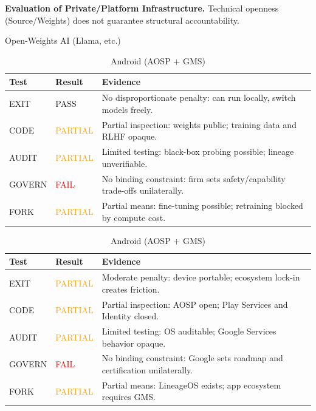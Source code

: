 \documentclass{article}
\begin{document}
\begin{table}[htbp]
    \centering
    \caption{\textbf{Evaluation of Private/Platform Infrastructure.} Technical openness (Source/Weights) does not guarantee structural accountability.}
    \label{tab:corp_infra}

    \begin{subtable}{1\textwidth}
        \centering
        \caption{Open-Weights AI (Llama, etc.)}
        \small
        \begin{tabular}{@{}llp{8.5cm}@{}}
            \toprule
            \textbf{Test} & \textbf{Result} & \textbf{Evidence} \\
            \midrule
            EXIT & \textcolor{green!50!black}{PASS} & No disproportionate penalty: can run locally, switch models freely. \\
            CODE & \textcolor{orange}{PARTIAL} & Partial inspection: weights public; training data and RLHF opaque. \\
            AUDIT & \textcolor{orange}{PARTIAL} & Limited testing: black-box probing possible; lineage unverifiable. \\
            GOVERN & \textcolor{red}{FAIL} & No binding constraint: firm sets safety/capability trade-offs unilaterally. \\
            FORK & \textcolor{orange}{PARTIAL} & Partial means: fine-tuning possible; retraining blocked by compute cost. \\
            \bottomrule
        \end{tabular}
        \vspace{0.3cm}
    \end{subtable}

    \begin{subtable}{1\textwidth}
        \centering
        \caption{Android (AOSP + GMS)}
        \small
        \begin{tabular}{@{}llp{8.5cm}@{}}
            \toprule
            \textbf{Test} & \textbf{Result} & \textbf{Evidence} \\
            \midrule
            EXIT & \textcolor{orange}{PARTIAL} & Moderate penalty: device portable; ecosystem lock-in creates friction. \\
            CODE & \textcolor{orange}{PARTIAL} & Partial inspection: AOSP open; Play Services and Identity closed. \\
            AUDIT & \textcolor{orange}{PARTIAL} & Limited testing: OS auditable; Google Services behavior opaque. \\
            GOVERN & \textcolor{red}{FAIL} & No binding constraint: Google sets roadmap and certification unilaterally. \\
            FORK & \textcolor{orange}{PARTIAL} & Partial means: LineageOS exists; app ecosystem requires GMS. \\
            \bottomrule
        \end{tabular}
        \vspace{0.3cm}
    \end{subtable}


\end{table}
\end{document}
